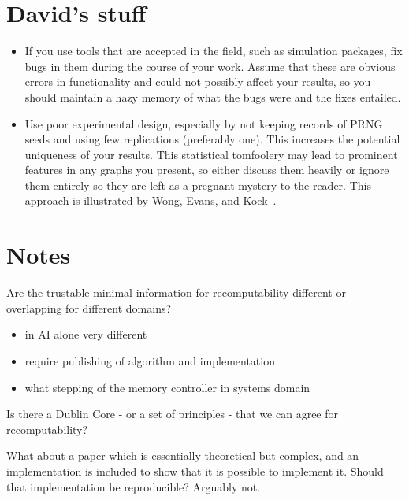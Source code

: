 \documentclass[a4paper,11pt]{article}
\begin{document}
\section{David's stuff}

\begin{itemize}
	\item If you use tools that are accepted in the field, such as
		simulation packages, fix bugs in them during the course of your
		work. Assume that these are obvious errors in functionality and
		could not possibly affect your results, so you should maintain a
		hazy memory of what the bugs were and the fixes entailed.

	\item Use poor experimental design, especially by not keeping
		records of PRNG seeds and using few replications (preferably
		one). This increases the potential uniqueness of your results.
		This statistical tomfoolery may lead to prominent features in
		any graphs you present, so either discuss them heavily or ignore
		them entirely so they are left as a pregnant mystery to the
		reader. This approach is illustrated by Wong, Evans, and
		Kock~\cite{Wong2000a}.

\end{itemize}

\section*{Notes}


Are the trustable minimal information for recomputability  different or overlapping for different domains?
\begin{itemize}
\item in AI alone very different
\item require publishing of algorithm and implementation
\item what stepping of the memory controller in systems domain
\end{itemize}

Is there a Dublin Core - or a set of principles - that we can agree
for recomputability?

What about a paper which is essentially theoretical but complex, and
an implementation is included to show that it is possible to implement
it. Should that implementation be reproducible? Arguably not.




\end{document}
